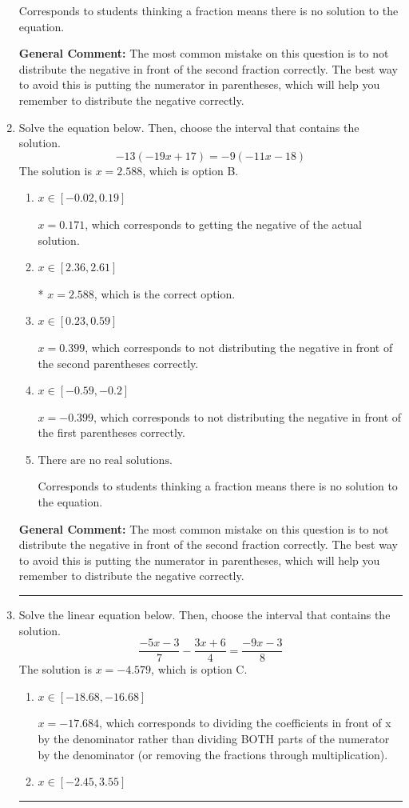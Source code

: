 \documentclass{extbook}[14pt]
\newcommand{\litem}[1]{\item #1

\rule{\textwidth}{0.4pt}}
\begin{document}
\begin{enumerate}
{\begin{enumerate}[label=\Alph*.]
Corresponds to students thinking a fraction means there is no solution to the equation.
\end{enumerate}

\textbf{General Comment:} The most common mistake on this question is to not distribute the negative in front of the second fraction correctly. The best way to avoid this is putting the numerator in parentheses, which will help you remember to distribute the negative correctly.
}
\litem{
Solve the equation below. Then, choose the interval that contains the solution.
\[ -13(-19x + 17) = -9(-11x -18) \]
The solution is \( x = 2.588 \), which is option B.\begin{enumerate}[label=\Alph*.]
\item \( x \in [-0.02, 0.19] \)

$x = 0.171$, which corresponds to getting the negative of the actual solution.
\item \( x \in [2.36, 2.61] \)

* $x = 2.588$, which is the correct option.
\item \( x \in [0.23, 0.59] \)

$x = 0.399$, which corresponds to not distributing the negative in front of the second parentheses correctly.
\item \( x \in [-0.59, -0.2] \)

$x = -0.399$, which corresponds to not distributing the negative in front of the first parentheses correctly.
\item \( \text{There are no real solutions.} \)

Corresponds to students thinking a fraction means there is no solution to the equation.
\end{enumerate}

\textbf{General Comment:} The most common mistake on this question is to not distribute the negative in front of the second fraction correctly. The best way to avoid this is putting the numerator in parentheses, which will help you remember to distribute the negative correctly.
}
\litem{
Solve the linear equation below. Then, choose the interval that contains the solution.
\[ \frac{-5x -3}{7} - \frac{3x + 6}{4} = \frac{-9x -3}{8} \]
The solution is \( x = -4.579 \), which is option C.\begin{enumerate}[label=\Alph*.]
\item \( x \in [-18.68, -16.68] \)

 $x = -17.684$, which corresponds to dividing the coefficients in front of x by the denominator rather than dividing BOTH parts of the numerator by the denominator (or removing the fractions through multiplication).
\item \( x \in [-2.45, 3.55] \)


\end{enumerate}}
\end{enumerate}
\end{document}
